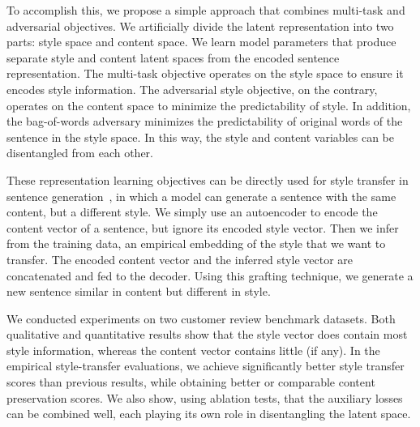 \documentclass[11pt,a4paper]{article}
\begin{document}
To accomplish this, we propose a simple approach that combines multi-task and adversarial objectives. We artificially divide the latent representation into two parts: style space and content space. We learn model parameters that produce separate style and content latent spaces from the encoded sentence representation. The multi-task objective operates on the style space to ensure it encodes style information. The adversarial style objective, on the contrary, operates on the content space to minimize the predictability of style. In addition, the bag-of-words adversary minimizes the predictability of original words of the sentence in the style space. In this way, the style and content variables can be disentangled from each other.

These representation learning objectives can be directly used for style transfer in sentence generation~\cite{hu2017toward,shen2017style,fu2017style}, in which a model can generate a sentence with the same content, but a different style. We simply use an autoencoder to encode the content vector of a sentence, but ignore its encoded style vector. Then we infer from the training data, an empirical embedding of the style that we want to transfer. The encoded content vector and the inferred style vector are concatenated and fed to the decoder. Using this grafting technique, we generate a new sentence similar in content but different in style.

We conducted experiments on two customer review benchmark datasets. Both qualitative and quantitative results show that the style vector does contain most style information, whereas the content vector contains little (if any). In the empirical style-transfer evaluations, we achieve significantly better style transfer scores than previous results, while obtaining better or comparable content preservation scores. We also show, using ablation tests, that the auxiliary losses can be combined well, each playing its own role in disentangling the latent space.
\end{document}
